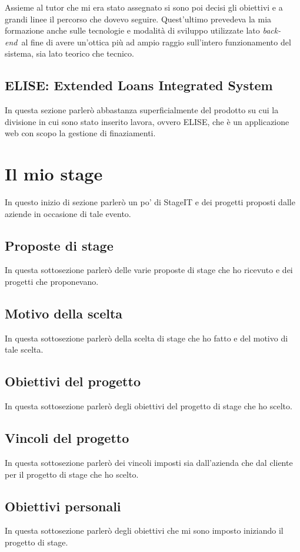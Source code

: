 Assieme al tutor che mi era stato assegnato si sono poi decisi gli obiettivi e a grandi linee il percorso che dovevo seguire. Quest'ultimo prevedeva la mia formazione anche sulle tecnologie e modalità di sviluppo utilizzate lato \textit{back-end}\glossario\ al fine di avere un'ottica più ad ampio raggio sull'intero funzionamento del sistema, sia lato teorico che tecnico.
	


\subsection{ELISE: Extended Loans Integrated System}
In questa sezione parlerò abbastanza superficialmente del prodotto su cui la divisione in cui sono stato inserito lavora, ovvero ELISE, che è un applicazione web con scopo la gestione di finaziamenti.
		
\section{Il mio stage}
In questo inizio di sezione parlerò un po' di StageIT e dei progetti proposti dalle aziende in occasione di tale evento.

\subsection{Proposte di stage}
In questa sottosezione parlerò delle varie proposte di stage che ho ricevuto e dei progetti che proponevano.

\subsection{Motivo della scelta}
In questa sottosezione parlerò della scelta di stage che ho fatto e del motivo di tale scelta.

\subsection{Obiettivi del progetto}
In questa sottosezione parlerò degli obiettivi del progetto di stage che ho scelto.

\subsection{Vincoli del progetto}
In questa sottosezione parlerò dei vincoli imposti sia dall'azienda che dal cliente per il progetto di stage che ho scelto.

\subsection{Obiettivi personali}
In questa sottosezione parlerò degli obiettivi che mi sono imposto iniziando il progetto di stage.
